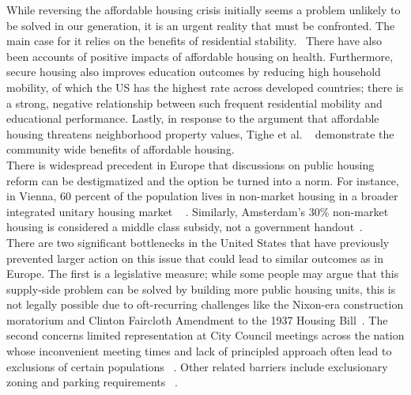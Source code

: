 \documentclass[11pt]{article}
\begin{document}
 \newline
While reversing the affordable housing crisis initially seems a problem unlikely to be solved in our generation, it is an urgent reality that must be confronted. The main case for it relies on the benefits of residential stability.~\cite{maqbool_insightsfromhousing_nodate} There have also been accounts of positive impacts of affordable housing on health. Furthermore, secure housing also improves education outcomes by reducing high household mobility, of which the US has the highest rate across developed countries; there is a strong, negative relationship between such frequent residential mobility and educational performance. Lastly, in response to the argument that affordable housing threatens neighborhood property values, Tighe et al. ~\cite{tighe_affordable_2012}  demonstrate the community wide benefits of affordable housing.\\
\newline
There is widespread precedent in Europe that discussions on public housing reform can be destigmatized and the option be turned into a norm. For instance, in Vienna, 60 percent of the population lives in non-market housing in a broader integrated unitary housing market ~\cite{marquardt_how_2020} . Similarly, Amsterdam's 30\% non-market housing is considered a middle class subsidy, not a government handout~\cite{hanneke_van_deursen_peoples_2023}.\\
\newline
There are two significant bottlenecks in the United States that have previously prevented larger action on this issue that could lead to similar outcomes as in Europe. The first is a legislative measure; while some people may argue that this supply-side problem can be solved by building more public housing units, this is not legally possible due to oft-recurring challenges like the Nixon-era construction moratorium and Clinton Faircloth Amendment to the 1937 Housing Bill~\cite{hud_guidance_nodate}. The second concerns limited representation at City Council meetings across the nation whose inconvenient meeting times and lack of principled approach often lead to exclusions of certain populations ~\cite{mcnee_nimbyism_2022}. Other related barriers include exclusionary zoning and parking requirements~\cite{jenna_davis_double-edged_2021} .\\
\end{document}
